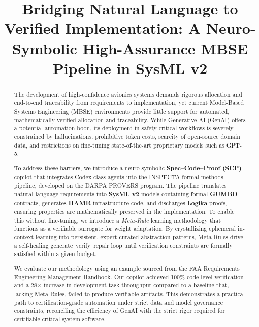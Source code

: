 \documentclass[conference]{IEEEtran}
\begin{document}
\title{Bridging Natural Language to Verified Implementation: A Neuro-Symbolic High-Assurance MBSE Pipeline in SysML v2}

\author{}


\maketitle

\begin{abstract}
The development of high-confidence avionics systems demands rigorous allocation and end-to-end traceability from requirements to implementation, yet current Model-Based Systems Engineering (MBSE) environments provide little support for automated, mathematically verified allocation and traceability. While Generative AI (GenAI) offers a potential automation boon, its deployment in safety-critical workflows is severely constrained by hallucinations, prohibitive token costs, scarcity of open-source domain data, and restrictions on fine-tuning state-of-the-art proprietary models such as GPT-5.

To address these barriers, we introduce a neuro-symbolic \textbf{Spec--Code--Proof (SCP)} copilot that integrates Codex-class agents into the INSPECTA formal methods pipeline, developed on the DARPA PROVERS program. The pipeline translates natural-language requirements into \textbf{SysML v2} models containing formal \textbf{GUMBO} contracts, generates \textbf{HAMR} infrastructure code, and discharges \textbf{Logika} proofs, ensuring properties are mathematically preserved in the implementation. To enable this without fine-tuning, we introduce a \textit{Meta-Rule} learning methodology that functions as a verifiable surrogate for weight adaptation. By crystallizing ephemeral in-context learning into persistent, expert-curated abstraction patterns, Meta-Rules drive a self-healing generate--verify--repair loop until verification constraints are formally satisfied within a given budget.


We evaluate our methodology using an example sourced from the FAA Requirements Engineering Management Handbook. Our copilot achieved 100\% code-level verification and a 28$\times$ increase in development task throughput compared to a baseline that, lacking Meta-Rules, failed to produce verifiable artifacts. This demonstrates a practical path to certification-grade automation under strict data and model governance constraints, reconciling the efficiency of GenAI with the strict rigor required for certifiable critical system software.
\end{abstract}
\end{document}
